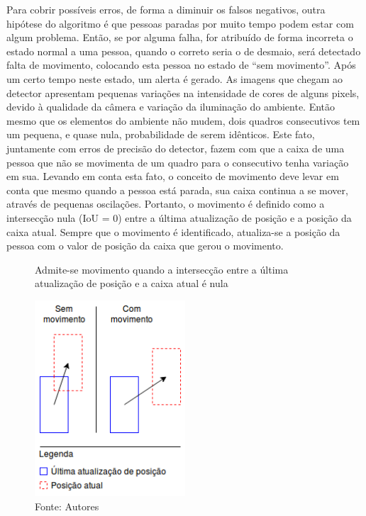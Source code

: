 \documentclass[]{politex}
\begin{document}
Para cobrir possíveis erros, de forma a diminuir os falsos negativos, outra hipótese do algoritmo é que pessoas paradas por muito tempo podem estar com algum problema. Então, se por alguma falha, for atribuído de forma incorreta o estado normal a uma pessoa, quando o correto seria o de desmaio, será detectado falta de movimento, colocando esta pessoa no estado de “sem movimento”. Após um certo tempo neste estado, um alerta é gerado. As imagens que chegam ao detector apresentam pequenas variações na intensidade de cores de alguns pixels, devido à qualidade da câmera e variação da iluminação do ambiente. Então mesmo que os elementos do ambiente não mudem, dois quadros consecutivos tem um pequena, e quase nula, probabilidade de serem idênticos. Este fato, juntamente com erros de precisão do detector, fazem com que a caixa de uma pessoa que não se movimenta de um quadro para o consecutivo tenha variação em sua. Levando em conta esta fato, o conceito de movimento deve levar em conta que mesmo quando a pessoa está parada, sua caixa continua a se mover, através de pequenas oscilações. Portanto, o movimento é definido como a intersecção nula (IoU = 0) entre a última atualização de posição e a posição da caixa atual. Sempre que o movimento é identificado, atualiza-se a posição da pessoa com o valor de posição da caixa que gerou o movimento.

\begin{figure}[H]
    \centering
    \caption{Admite-se movimento quando a intersecção entre a última atualização de posição e a caixa atual é nula}
    \includegraphics[width=0.5\textwidth]{Movimento}
    \caption*{Fonte: Autores}
    \label{fig:movimento}
\end{figure}
\end{document}
